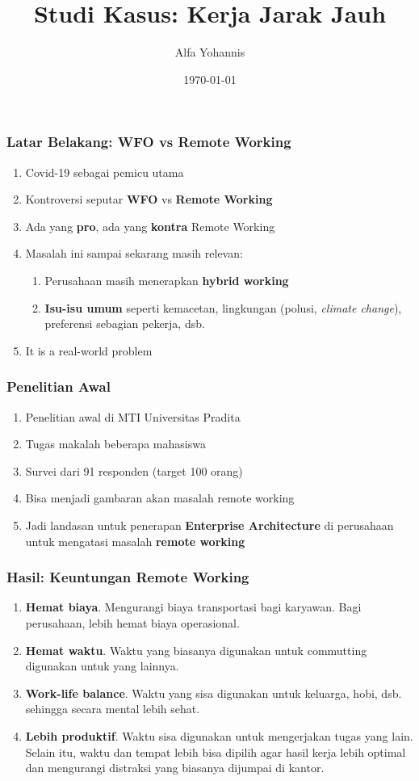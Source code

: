 \documentclass[aspectratio=169]{beamer}
\title{Studi Kasus: Kerja Jarak Jauh}
\author{Alfa Yohannis}
\date{\today}
\begin{document}
	
	\frame{\titlepage}
	
	\begin{frame}
		\frametitle{Latar Belakang: WFO vs Remote Working}
		\begin{enumerate}
			\item Covid-19 sebagai pemicu utama
			\item Kontroversi seputar \textbf{WFO} vs \textbf{Remote Working}
			\item Ada yang \textbf{pro}, ada yang \textbf{kontra} Remote Working
			\item Masalah ini sampai sekarang masih relevan:
			\begin{enumerate}
				\item Perusahaan masih menerapkan \textbf{hybrid working}
				\item \textbf{Isu-isu umum} seperti kemacetan, lingkungan (polusi, \textit{climate change}), preferensi sebagian pekerja, dsb.
			\end{enumerate}
			\item It is a real-world problem
		\end{enumerate}
	\end{frame}
	
	\begin{frame}
		\frametitle{Penelitian Awal}
		\begin{enumerate}
			\item Penelitian awal di MTI Universitas Pradita
			\item Tugas makalah beberapa mahasiswa
			\item Survei dari  91 responden (target 100 orang)
			\item Bisa menjadi gambaran akan masalah remote working
			\item Jadi landasan untuk penerapan \textbf{Enterprise Architecture} di perusahaan untuk mengatasi masalah \textbf{remote working}
		\end{enumerate}
	\end{frame}
	
	\begin{frame}
		\frametitle{Hasil: Keuntungan Remote Working}
		\begin{enumerate}
			\item \textbf{Hemat biaya}. Mengurangi biaya transportasi bagi karyawan. Bagi perusahaan, lebih hemat biaya operasional.
			\item \textbf{Hemat waktu}. Waktu yang biasanya digunakan untuk commutting digunakan untuk yang lainnya.
			\item \textbf{Work-life balance}. Waktu yang sisa digunakan untuk keluarga, hobi, dsb. sehingga secara mental lebih sehat.
			\item \textbf{Lebih produktif}. Waktu sisa digunakan untuk mengerjakan tugas yang lain. Selain itu, waktu dan tempat lebih bisa dipilih agar hasil kerja lebih optimal dan mengurangi distraksi yang biasanya dijumpai di kantor.
		\end{enumerate}
	\end{frame}
	
\end{document}
